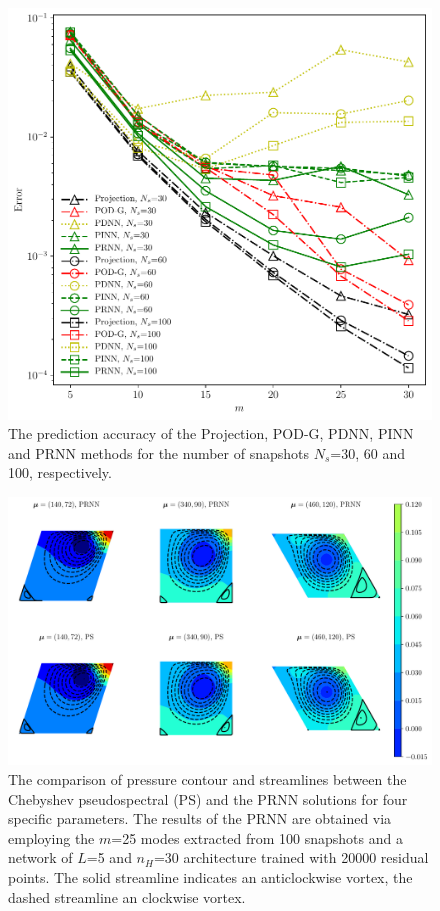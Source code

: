 \documentclass[preprint, 10pt]{elsarticle}
\begin{document}
\begin{figure}[!ht]
  \centering
  \includegraphics[width=12cm]{../../pythonNN/2DLidDriven/fig/ErrorComparsion_SampleNum.pdf}
\caption{The prediction accuracy of the Projection, POD-G, PDNN, PINN and PRNN methods for the number of snapshots $N_s$=30, 60 and 100, respectively.}
\label{fig_2DLidDrivenErrorComparsion_SampleNum}
\end{figure}

\begin{figure}[!ht]
  \centering
  \includegraphics[width=14cm]{../../pythonNN/2DLidDriven/fig/ResultComparsion.pdf}
\caption{The comparison of pressure contour and streamlines between the Chebyshev pseudospectral (PS) and the PRNN solutions for four specific parameters. The results of the PRNN are obtained via employing the $m$=25 modes extracted from 100 snapshots and a network of $L$=5 and $n_H$=30 architecture trained with 20000 residual points. The solid streamline indicates an anticlockwise vortex, the dashed streamline an clockwise vortex.}
\label{fig_2DLidDrivenResultComparsion}
\end{figure}
\end{document}
